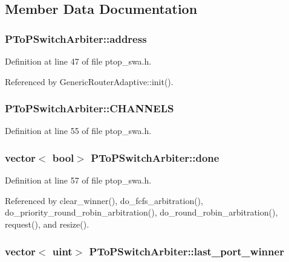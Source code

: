 \subsection{Member Data Documentation}
\subsubsection[{address}]{ {\bf PToPSwitchArbiter::address}}\label{classPToPSwitchArbiter_a01c0b9c63131ca029da5129d417ce0e}




Definition at line 47 of file ptop\_\-swa.h.

Referenced by GenericRouterAdaptive::init().
\subsubsection[{CHANNELS}]{ {\bf PToPSwitchArbiter::CHANNELS}\hspace{0.3cm}{\tt  [private]}}\label{classPToPSwitchArbiter_7d44089feeffb503774491929479d17e}




Definition at line 55 of file ptop\_\-swa.h.
\subsubsection[{done}]{\setlength{\rightskip}{0pt plus 5cm}vector$<$ bool$>$ {\bf PToPSwitchArbiter::done}\hspace{0.3cm}{\tt  [private]}}\label{classPToPSwitchArbiter_cbdde7ef64128ddefe4cd4ab9a145473}




Definition at line 57 of file ptop\_\-swa.h.

Referenced by clear\_\-winner(), do\_\-fcfs\_\-arbitration(), do\_\-priority\_\-round\_\-robin\_\-arbitration(), do\_\-round\_\-robin\_\-arbitration(), request(), and resize().
\subsubsection[{last\_\-port\_\-winner}]{\setlength{\rightskip}{0pt plus 5cm}vector$<$ {\bf uint}$>$ {\bf PToPSwitchArbiter::last\_\-port\_\-winner}\hspace{0.3cm}{\tt  [private]}}\label{classPToPSwitchArbiter_734777a5e9b87a0785a0ebb6a0d1fb58}




